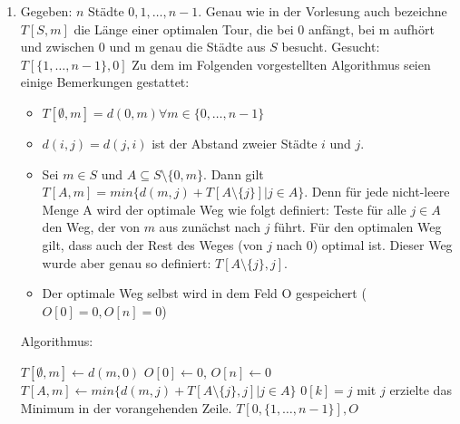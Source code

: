 \documentclass[a4paper,10pt]{scrartcl}
\begin{document}
\begin{enumerate}
 \item
Gegeben: $n$ Städte $0, 1, \hdots, n - 1$. Genau wie in der Vorlesung auch bezeichne $T[S, m]$ die Länge einer optimalen Tour, die bei 0 anfängt, bei m aufhört und zwischen 0 und m genau die Städte aus
$S$ besucht. \newline
Gesucht: $T[\{1, \hdots, n - 1\}, 0]$ \newline
Zu dem im Folgenden vorgestellten Algorithmus seien einige Bemerkungen gestattet:
\begin{itemize}
 \item $T[\emptyset, m] = d(0, m) \forall m \in \{0, \hdots, n - 1\}$
 \item $d(i, j) = d(j, i)$ ist der Abstand zweier Städte $i$ und $j$.
 \item Sei $m \in S$ und $A \subseteq S \setminus \{0, m\}$. Dann gilt $T[A, m] = min\{d(m,j) + T[A \setminus \{ j \}] \left. \right| j \in A\}$. Denn für jede nicht-leere Menge
 A wird der optimale Weg wie folgt definiert: Teste für alle $j \in A$ den Weg, der von $m$ aus zunächst nach $j$ führt. Für den optimalen Weg gilt, dass auch der Rest des Weges (von $j$ nach $0$) optimal ist.
 Dieser Weg wurde aber genau so definiert: $T[A \setminus \{ j \}, j]$.
 \item Der optimale Weg selbst wird in dem Feld O gespeichert ($O[0] = 0, O[n] = 0$)
\end{itemize}

Algorithmus:


  \begin{algorithmic}
      \STATE $T[\emptyset, m] \gets d(m,0)$
   \ENDFOR
  \STATE $O[0] \gets 0$, $O[n] \gets 0$
	  \STATE $T[A,m] \gets min\{d(m, j) + T[A \setminus \{j\}, j] \left. \right|  j \in A\}$
	  \STATE $0[k] = j $ mit $ j$ erzielte das Minimum in der vorangehenden Zeile.
	\ENDIF
      \ENDFOR
    \ENDFOR
  \ENDFOR
  \RETURN $T[0,\{1, \hdots, n - 1\}], O$
  \end{algorithmic}

\end{enumerate}
\end{document}
